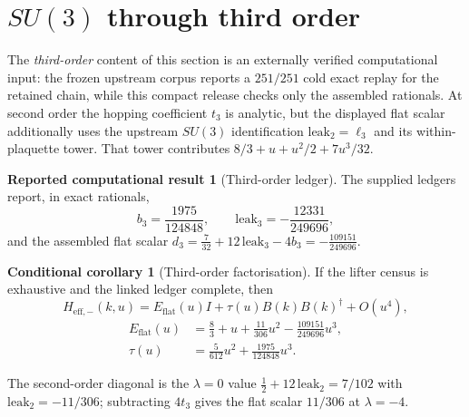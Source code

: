 \documentclass[11pt]{article}
\theoremstyle{plain}
\theoremstyle{definition}
\newtheorem{reported}[theorem]{Reported computational result}
\newtheorem{conditional}[theorem]{Conditional corollary}
\theoremstyle{remark}
\newcommand{\chk}[1]{}
\newcommand{\dg}{^{\dagger}}
\begin{document}
\section{\texorpdfstring{$SU(3)$}{SU(3)} through third order}
\label{sec:su3}

The \emph{third-order} content of this section is an externally verified
computational input: the frozen upstream corpus reports a $251/251$ cold exact
replay for the retained chain, while this compact release checks only the
assembled rationals. At second order the hopping coefficient $t_3$ is analytic,
but the displayed flat scalar additionally uses the upstream $SU(3)$
identification $\mathrm{leak}_2=\ell_3$ and its within-plaquette tower. That
tower contributes $8/3+u+u^2/2+7u^3/32$.

\begin{reported}[Third-order ledger]\label{rep:su3}
The supplied ledgers report, in exact rationals,
\[
  b_3=\frac{1975}{124848},\qquad
  \mathrm{leak}_3=-\frac{12331}{249696},
\]
and the assembled flat scalar
$d_3=\tfrac7{32}+12\,\mathrm{leak}_3-4b_3=-\tfrac{109151}{249696}$.
\end{reported}
\chk{d\_3 = 7/32 + 12*leak\_3 - 4*b\_3}
\chk{leak\_3 is assembled from the domino diagonal and the vacuum piece}

\begin{conditional}[Third-order factorisation]\label{cor:su3}
If the lifter census is exhaustive and the linked ledger complete, then
\[
  H_{\mathrm{eff},-}(k,u)=E_{\mathrm{flat}}(u)I+\tau(u)B(k)B(k)\dg+O(u^4),
\]
\[
  \begin{aligned}
    E_{\mathrm{flat}}(u)&=\tfrac83+u+\tfrac{11}{306}u^2-\tfrac{109151}{249696}u^3,\\
    \tau(u)&=\tfrac5{612}u^2+\tfrac{1975}{124848}u^3 .
  \end{aligned}
\]
\end{conditional}
\chk{E\_flat and t(u) carry the ledger coefficients}

The second-order diagonal is the $\lambda=0$ value
$\tfrac12+12\,\mathrm{leak}_2=7/102$ with $\mathrm{leak}_2=-11/306$;
subtracting $4t_3$ gives the flat scalar $11/306$ at $\lambda=-4$.
\chk{d\_- = 1/2 + 12*leak\_2, and leak\_2 = -11/306}
\end{document}
